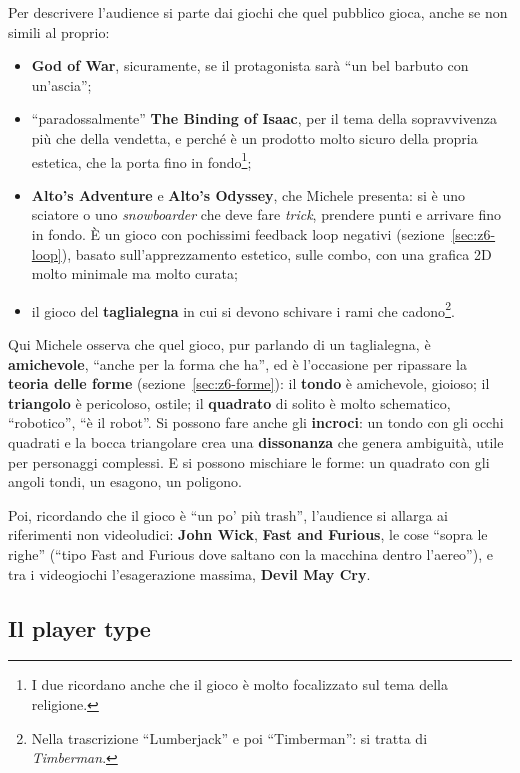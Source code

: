 Per descrivere l'audience si parte dai giochi che quel pubblico gioca, anche se
non simili al proprio:
\begin{itemize}
  \item \textbf{God of War}, sicuramente, se il protagonista sarà ``un bel
        barbuto con un'ascia'';
  \item ``paradossalmente'' \textbf{The Binding of Isaac}, per il tema della
        sopravvivenza più che della vendetta, e perché è un prodotto molto
        sicuro della propria estetica, che la porta fino in fondo\footnote{I
        due ricordano anche che il gioco è molto focalizzato sul tema della
        religione.};
  \item \textbf{Alto's Adventure} e \textbf{Alto's Odyssey}, che Michele
        presenta: si è uno sciatore o uno \emph{snowboarder} che deve fare
        \emph{trick}, prendere punti e arrivare fino in fondo. È un gioco con
        pochissimi feedback loop negativi (sezione~\ref{sec:z6-loop}), basato
        sull'apprezzamento estetico, sulle combo, con una grafica 2D molto
        minimale ma molto curata;
  \item il gioco del \textbf{taglialegna} in cui si devono schivare i rami che
        cadono\footnote{Nella trascrizione ``Lumberjack'' e poi ``Timberman'':
        si tratta di \emph{Timberman}.}.
\end{itemize}
Qui Michele osserva che quel gioco, pur parlando di un taglialegna, è
\textbf{amichevole}, ``anche per la forma che ha'', ed è l'occasione per
ripassare la \textbf{teoria delle forme} (sezione~\ref{sec:z6-forme}): il
\textbf{tondo} è amichevole, gioioso; il \textbf{triangolo} è pericoloso, ostile;
il \textbf{quadrato} di solito è molto schematico, ``robotico'', ``è il robot''.
Si possono fare anche gli \textbf{incroci}: un tondo con gli occhi quadrati e la
bocca triangolare crea una \textbf{dissonanza} che genera ambiguità, utile per
personaggi complessi. E si possono mischiare le forme: un quadrato con gli angoli
tondi, un esagono, un poligono.

Poi, ricordando che il gioco è ``un po' più trash'', l'audience si allarga ai
riferimenti non videoludici: \textbf{John Wick}, \textbf{Fast and Furious}, le cose
``sopra le righe'' (``tipo Fast and Furious dove saltano con la macchina dentro
l'aereo''), e tra i videogiochi l'esagerazione massima, \textbf{Devil May Cry}.

\subsection{Il player type}

